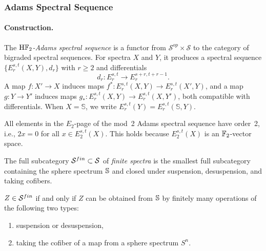 \subsubsection{Adams Spectral Sequence}\label{sec:prereq-adams}

\paragraph{Construction.}

\begin{axiom}\label{prereq:ax:adams-ss}
    \leanok
    The \emph{$\mathrm{H}{\mathbb F}_2$-Adams spectral sequence} is a functor from $\mathcal{S}^{op} \times \mathcal{S}$ to the category of bigraded spectral sequences. For spectra $X$ and $Y$, it produces a spectral sequence $\{E_r^{s,t}(X, Y), d_r\}$ with $r \ge 2$ and differentials
    $$d_r: E_r^{s,t} \to E_r^{s+r, t+r-1}.$$
    A map $f: X' \to X$ induces maps $f^*: E_r^{s,t}(X, Y) \to E_r^{s,t}(X', Y)$, and a map $g: Y \to Y'$ induces maps $g_*: E_r^{s,t}(X, Y) \to E_r^{s,t}(X, Y')$, both compatible with differentials. When $X = \mathbb{S}$, we write $E_r^{s,t}(Y) = E_r^{s,t}(\mathbb{S}, Y)$.
\end{axiom}

\begin{axiom}\label{prereq:ax:adams-e2-order2}
    \leanok
    All elements in the $E_2$-page of the mod~2 Adams spectral sequence have order~2, i.e., $2x = 0$ for all $x \in E_2^{s,t}(X)$. This holds because $E_2^{s,t}(X)$ is an ${\mathbb F}_2$-vector space.
\end{axiom}

\begin{definition}\label{prereq:def:finite-spectra}
    The full subcategory ${\mathcal S}^{fin} \subset {\mathcal S}$ of \emph{finite spectra} is the smallest full subcategory containing the sphere spectrum ${\mathbb S}$ and closed under suspension, desuspension, and taking cofibers.
\end{definition}

\begin{theorem}\label{prereq:thm:finite-spectra-char}
    $Z \in {\mathcal S}^{fin}$ if and only if $Z$ can be obtained from ${\mathbb S}$ by finitely many operations of the following two types:
    \begin{enumerate}
        \item suspension or desuspension,
        \item taking the cofiber of a map from a sphere spectrum $S^n$.
    \end{enumerate}
\end{theorem}

